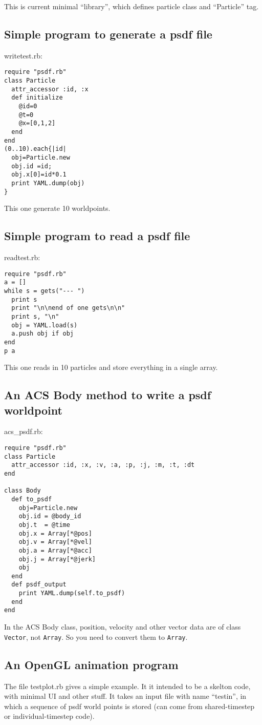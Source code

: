 \documentclass[12pt]{article}
\begin{document}
This is current minimal ``library'', which defines particle class and
``Particle'' tag.

\subsection{Simple program to generate a psdf file}

writetest.rb:
\begin{verbatim}
require "psdf.rb"
class Particle
  attr_accessor :id, :x   
  def initialize
    @id=0
    @t=0
    @x=[0,1,2]
  end
end
(0..10).each{|id|
  obj=Particle.new
  obj.id =id;
  obj.x[0]=id*0.1
  print YAML.dump(obj)
}
\end{verbatim}

This one generate 10 worldpoints.

\subsection{Simple program to read a psdf file}

readtest.rb:
\begin{verbatim}
require "psdf.rb"
a = []
while s = gets("--- ")
  print s
  print "\n\nend of one gets\n\n"
  print s, "\n"
  obj = YAML.load(s) 
  a.push obj if obj
end
p a
\end{verbatim}

This one reads in 10 particles and store everything in a single array.

\subsection{An ACS Body method to write a psdf worldpoint}

acs\_psdf.rb:
\begin{verbatim}
require "psdf.rb"
class Particle
  attr_accessor :id, :x, :v, :a, :p, :j, :m, :t, :dt
end

class Body
  def to_psdf
    obj=Particle.new
    obj.id = @body_id
    obj.t  = @time
    obj.x = Array[*@pos]
    obj.v = Array[*@vel]
    obj.a = Array[*@acc]
    obj.j = Array[*@jerk]
    obj
  end
  def psdf_output
    print YAML.dump(self.to_psdf)
  end
end
\end{verbatim}

In the ACS Body class, position, velocity and other vector data are of
class {\tt Vector}, not {\tt Array}. So you need to convert them to
{\tt Array}.

\subsection{An OpenGL animation program}

The file testplot.rb gives a simple example. It it intended to be a
skelton code, with minimal UI and other stuff. It takes an input file
with name ``testin'', in which a sequence of psdf world points is
stored (can come from shared-timestep or individual-timestep code).
\end{document}

